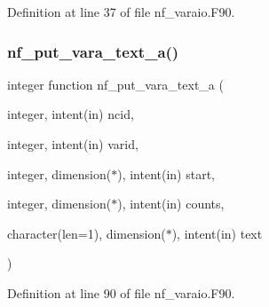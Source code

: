 Definition at line 37 of file nf\+\_\+varaio.\+F90.

\mbox{\label{nf__varaio_8F90_a06ecd750696650b2ff2d1e8c5f7a9809}} 
\subsubsection{\texorpdfstring{nf\+\_\+put\+\_\+vara\+\_\+text\+\_\+a()}{nf\_put\_vara\_text\_a()}}
{\footnotesize\ttfamily integer function nf\+\_\+put\+\_\+vara\+\_\+text\+\_\+a (\begin{DoxyParamCaption}\item[{integer, intent(in)}]{ncid,  }\item[{integer, intent(in)}]{varid,  }\item[{integer, dimension($\ast$), intent(in)}]{start,  }\item[{integer, dimension($\ast$), intent(in)}]{counts,  }\item[{character(len=1), dimension($\ast$), intent(in)}]{text }\end{DoxyParamCaption})}



Definition at line 90 of file nf\+\_\+varaio.\+F90.

